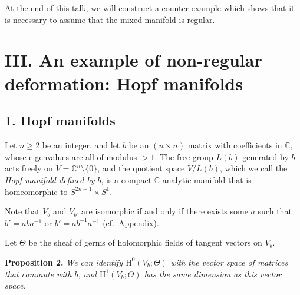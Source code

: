 \documentclass[british]{article}
\newenvironment{itenv}[1]
  {\phantomsection\par\smallskip\noindent\textbf{#1.}\itshape}
  {\par\smallskip}
\begin{document}
At the end of this talk, we will construct a counter-example which shows
that it is necessary to assume that the mixed manifold is regular.

\section*{III. An example of non-regular deformation: Hopf
manifolds}\label{three-section-III}

\subsection*{1. Hopf manifolds}\label{three-section-III.1}

Let \(n\geqslant 2\) be an integer, and let \(b\) be an \((n\times n)\)
matrix with coefficients in \(\mathbb{C}\), whose eigenvalues are all of
modulus \(>1\). The free group \(L(b)\) generated by \(b\) acts freely
on \(\widetilde{V}=\mathbb{C}^n\setminus\{0\}\), and the quotient space
\(\widetilde{V}/L(b)\), which we call the \emph{Hopf manifold defined by
\(b\)}, is a compact \(\mathbb{C}\)-analytic manifold that is
homeomorphic to \(S^{2n-1}\times S^1\).

Note that \(V_b\) and \(V_{b'}\) are isomorphic if and only if there
exists some \(a\) such that \(b'=aba^{-1}\) or \(b'=ab^{-1}a^{-1}\)
(cf.~\hyperref[three-appendix]{Appendix}).

Let \(\Theta\) be the sheaf of germs of holomorphic fields of tangent
vectors on \(V_b\).

\protect{}\label{three-proposition-2}
\begin{itenv}{Proposition 2}
We can identify \(\mathrm{H}^0(V_b;\Theta)\) with the vector space of
matrices that commute with \(b\), and \(\mathrm{H}^1(V_b;\Theta)\) has
the same dimension as this vector space.

\end{itenv}
\end{document}

